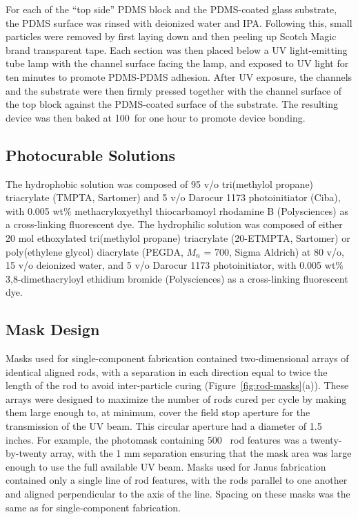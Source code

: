 For each of the ``top side'' PDMS block and the PDMS-coated glass substrate, the PDMS surface was rinsed with 
deionized water and IPA.  Following this, small particles were removed by first laying down and then peeling up
Scotch Magic brand transparent tape.  Each section was then placed below a UV light-emitting
tube lamp with the channel surface facing the lamp, and exposed to UV light for ten minutes to promote PDMS-PDMS
adhesion.  After UV exposure, the channels and the 
substrate were then firmly pressed together with the channel surface of the top
block against the PDMS-coated surface of the substrate.  The resulting device was then baked at 100\degC~for one hour
to promote device bonding.

\subsection{Photocurable Solutions}
\label{sec:janus-materials}
The hydrophobic solution was composed of 95 v/o 
tri(methylol propane) triacrylate (TMPTA, Sartomer) and 5 v/o Darocur 1173 photoinitiator (Ciba), 
with 0.005 wt\% methacryloxyethyl thiocarbamoyl rhodamine B (Polysciences) as a cross-linking 
fluorescent dye.
The hydrophilic solution was composed of either 20 mol ethoxylated tri(methylol propane) triacrylate (20-ETMPTA,
Sartomer) or poly(ethylene glycol) diacrylate (PEGDA, $M_n$ = 700, Sigma Aldrich) at 80 v/o, 
15 v/o deionized water, and 5 v/o Darocur 1173 photoinitiator, with 0.005 wt\% 
3,8-dimethacryloyl ethidium bromide (Polysciences) as a cross-linking fluorescent dye.


\subsection{Mask Design}

Masks used for single-component fabrication contained two-dimensional arrays of identical aligned 
rods, with a separation in each direction equal to twice the length of the rod to avoid inter-particle
curing (Figure~\ref{fig:rod-masks}(a)). These arrays were designed to maximize the number of 
rods cured per cycle by making them large enough to, at minimum,
cover the field stop aperture for the transmission of the UV beam. This circular aperture 
had a diameter of 1.5 inches.  For example, the photomask containing 500 \microns~rod features
was a twenty-by-twenty array, with the 1 mm separation ensuring that the mask area was large enough to
use the full available UV beam.  
Masks used for Janus fabrication contained only a single line of rod features, with the rods parallel to one 
another and aligned perpendicular to the axis of the line.  Spacing on these 
masks was the same as for single-component fabrication.


